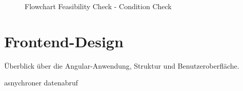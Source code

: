 \begin{figure}[!h]
    \centering
    \caption{Flowchart Feasibility Check - Condition Check }
    \label{fig:feasibility-check-condition-check}
\end{figure}

\section{Frontend-Design}
Überblick über die Angular-Anwendung, Struktur und Benutzeroberfläche.

asnychroner datenabruf